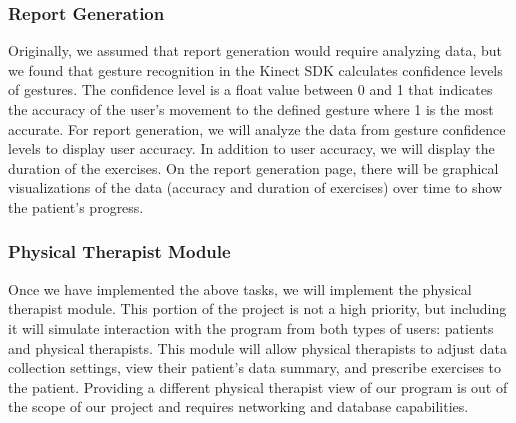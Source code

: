\documentclass[onecolumn, draftclsnofoot,10pt, compsoc]{IEEEtran}
\begin{document}
\subsubsection{Report Generation}
Originally, we assumed that report generation would require analyzing data, but we found that gesture recognition in the Kinect SDK calculates confidence levels of gestures. The confidence level is a float value between 0 and 1 that indicates the accuracy of the user's movement to the defined gesture where 1 is the most accurate. For report generation, we will analyze the data from gesture confidence levels to display user accuracy. In addition to user accuracy, we will display the duration of the exercises. On the report generation page, there will be graphical visualizations of the data (accuracy and duration of exercises) over time to show the patient's progress.

\subsubsection{Physical Therapist Module}
Once we have implemented the above tasks, we will implement the physical therapist module. This portion of the project is not a high priority, but including it will simulate interaction with the program from both types of users: patients and physical therapists. This module will allow physical therapists to adjust data collection settings, view their patient's data summary, and prescribe exercises to the patient. Providing a different physical therapist view of our program is  out of the scope of our project and requires networking and database capabilities.
\end{document}
